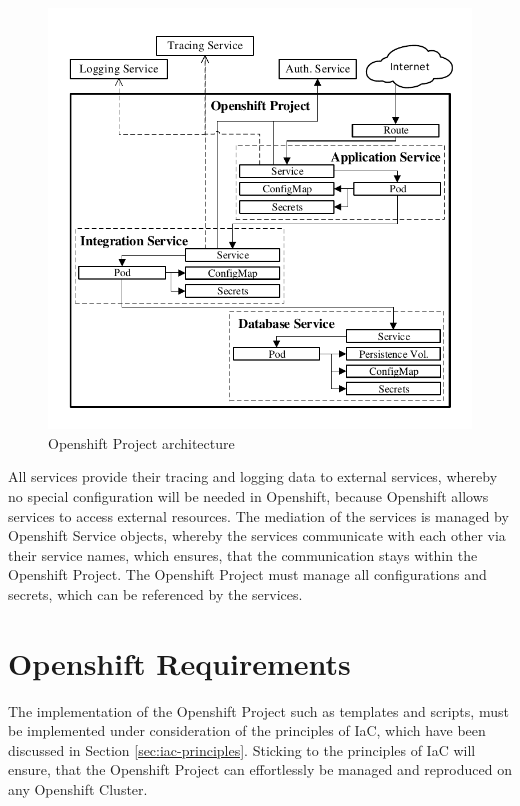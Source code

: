 \begin{figure}[htbp]
	\centering
	\includegraphics[scale=1]{images/esboc-design-openshift.pdf}
	\caption{Openshift Project architecture}
	\label{fig:esboc-design-openshift-project}
\end{figure} 

All services provide their tracing and logging data to external services, whereby no special configuration will be needed in Openshift, because Openshift allows services to access external resources. The mediation of the services is managed by Openshift Service objects, whereby the services communicate with each other via their service names, which ensures, that the communication stays within the Openshift Project. The Openshift Project must manage all configurations and secrets, which can be referenced by the services.

\section{Openshift Requirements}
\label{sec:esboc-requirements-oc}
The implementation of the Openshift Project such as templates and scripts, must be implemented under consideration of the principles of IaC, which have been discussed in Section \vref{sec:iac-principles}. Sticking to the principles of IaC will ensure, that the Openshift Project can effortlessly be managed and reproduced on any Openshift Cluster. \\

